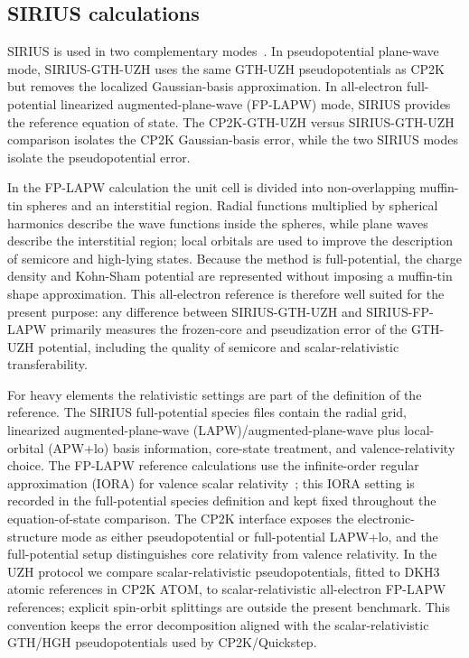 \documentclass[aps,prb,preprint,amsmath,amssymb,superscriptaddress,longbibliography,floatfix]{revtex4-2}
\begin{document}
\subsection{SIRIUS calculations}

SIRIUS is used in two complementary modes~\cite{Zhang2022Computation,Zhang2023Sirius,SiriusDocs}. In pseudopotential plane-wave mode, SIRIUS-GTH-UZH uses the same GTH-UZH pseudopotentials as CP2K but removes the localized Gaussian-basis approximation. In all-electron full-potential linearized augmented-plane-wave (FP-LAPW) mode, SIRIUS provides the reference equation of state. The CP2K-GTH-UZH versus SIRIUS-GTH-UZH comparison isolates the CP2K Gaussian-basis error, while the two SIRIUS modes isolate the pseudopotential error.

In the FP-LAPW calculation the unit cell is divided into non-overlapping muffin-tin spheres and an interstitial region. Radial functions multiplied by spherical harmonics describe the wave functions inside the spheres, while plane waves describe the interstitial region; local orbitals are used to improve the description of semicore and high-lying states. Because the method is full-potential, the charge density and Kohn-Sham potential are represented without imposing a muffin-tin shape approximation. This all-electron reference is therefore well suited for the present purpose: any difference between SIRIUS-GTH-UZH and SIRIUS-FP-LAPW primarily measures the frozen-core and pseudization error of the GTH-UZH potential, including the quality of semicore and scalar-relativistic transferability.

For heavy elements the relativistic settings are part of the definition of the reference. The SIRIUS full-potential species files contain the radial grid, linearized augmented-plane-wave (LAPW)/augmented-plane-wave plus local-orbital (APW+lo) basis information, core-state treatment, and valence-relativity choice. The FP-LAPW reference calculations use the infinite-order regular approximation (IORA) for valence scalar relativity~\cite{Dyall1999IORA}; this IORA setting is recorded in the full-potential species definition and kept fixed throughout the equation-of-state comparison. The CP2K interface exposes the electronic-structure mode as either pseudopotential or full-potential LAPW+lo, and the full-potential setup distinguishes core relativity from valence relativity. In the UZH protocol we compare scalar-relativistic pseudopotentials, fitted to DKH3 atomic references in CP2K ATOM, to scalar-relativistic all-electron FP-LAPW references; explicit spin-orbit splittings are outside the present benchmark. This convention keeps the error decomposition aligned with the scalar-relativistic GTH/HGH pseudopotentials used by CP2K/Quickstep.
\end{document}
